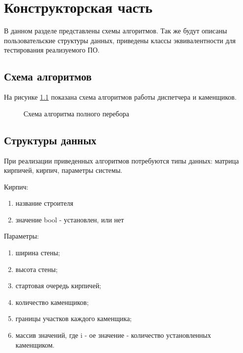 
\chapter{Конструкторская часть}\label{Konstruct}

В данном разделе представлены схемы алгоритмов. Так же будут описаны пользовательские структуры данных, 
приведены классы эквивалентности для тестирования реализуемого ПО.

\section{Схема алгоритмов}\label{SchemaAlg}

На рисунке \ref{ris:schemaposav} показана схема алгоритмов работы диспетчера и каменщиков.

\begin{figure}[H]
  \caption{Схема алгоритма полного перебора}
  \label{ris:schemaposav}
\end{figure}

\section{Структуры данных}\label{Structs}

При реализации приведенных алгоритмов потребуются типы данных: матрица кирпичей, кирпич, параметры системы.

Кирпич:

\begin{enumerate}
  \item название строителя 
  \item значение bool - установлен, или нет
\end{enumerate}

Параметры:

\begin{enumerate}
  \item ширина стены;
  \item высота стены;
  \item стартовая очередь кирпичей; 
  \item количество каменщиков;
  \item границы участков каждого каменщика;
  \item массив значений, где i - ое значение - количество установленных каменщиком.
\end{enumerate}

